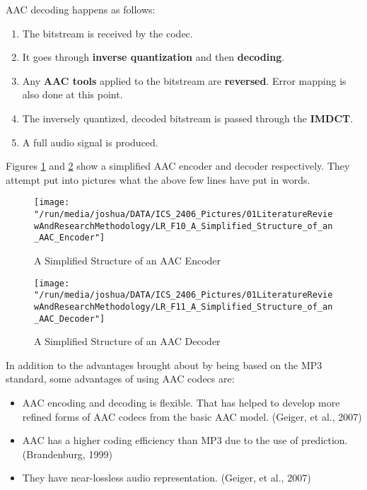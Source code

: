 \documentclass[12pt,svgnames,smaller]{article} %
\begin{document}
\begin{enumerate}
		AAC decoding happens as follows:
		
		\begin{enumerate}
			\item The bitstream is received by the codec.
			\item It goes through \textbf{inverse quantization} and then \textbf{decoding}. 
			\item Any \textbf{AAC tools} applied to the bitstream are \textbf{reversed}. Error mapping is also done at this point.
			\item The inversely quantized, decoded bitstream is passed through the \textbf{IMDCT}.
			\item A full audio signal is produced.
		\end{enumerate}
		
		Figures \ref{fig:LiteratureReview-Figure10} and \ref{fig:LiteratureReview-Figure11} show a simplified AAC encoder and decoder respectively. They attempt put into pictures what the above few lines have put in words.
		
		\begin{figure}
			\centering
			\texttt{[image: "/run/media/joshua/DATA/ICS\_2406\_Pictures/01LiteratureReviewAndResearchMethodology/LR\_F10\_A\_Simplified\_Structure\_of\_an\_AAC\_Encoder"]}
			\caption{A Simplified Structure of an AAC Encoder}
			\label{fig:LiteratureReview-Figure10}
		\end{figure}
		
		\begin{figure}
			\centering
			\texttt{[image: "/run/media/joshua/DATA/ICS\_2406\_Pictures/01LiteratureReviewAndResearchMethodology/LR\_F11\_A\_Simplified\_Structure\_of\_an\_AAC\_Decoder"]}
			\caption{A Simplified Structure of an AAC Decoder}
			\label{fig:LiteratureReview-Figure11}
		\end{figure}
		
		In addition to the advantages brought about by being based on the MP3 standard, some advantages of using AAC codecs are:
		
		\begin{itemize}
			\item AAC encoding and decoding is flexible. That has helped to develop more refined forms of AAC codecs from the basic AAC model. (Geiger, et al., 2007)
			\item AAC has a higher coding efficiency than MP3 due to the use of prediction. (Brandenburg, 1999)
			\item They have near-lossless audio representation. (Geiger, et al., 2007)
		\end{itemize}
		

\end{enumerate}
\end{document}
